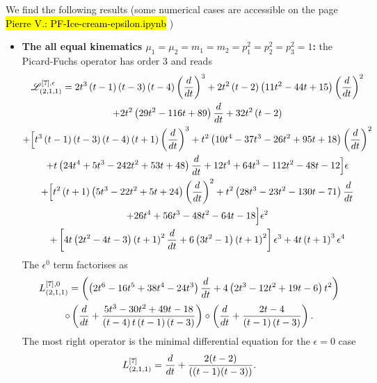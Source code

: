 \documentclass[a4paper,12pt]{article}
\numberwithin{equation}{section}
\numberwithin{figure}{subsection}
\theoremstyle{plain}
\theoremstyle{plain}
\theoremstyle{definition}
\theoremstyle{plain}
\theoremstyle{remark}
\theoremstyle{plain}
\newcommand{\pvnote}[1]{\sethlcolor{bubblegum} \protect\hl{Pierre V.: #1} \sethlcolor{yellow}}
\begin{document}
We find the following results (some numerical cases are accessible on
the page \pvnote{PF-Ice-cream-epsilon.ipynb})
\begin{itemize}
\item {\bf The all equal kinematics
  $\mu_1=\mu_2=m_1=m_2=p_1^2=p_2^2=p_3^2=1$:} the Picard-Fuchs operator
  has order 3 and
  reads
  \begin{multline}
\mathscr{L}_{(2,1,1)}^{[7],\epsilon}= 2 t^{3} \left(t -1\right)
\left(t -3\right) \left(t -4\right) \left(d\over dt\right)^{3}+2 t^{2} \left(t
  -2\right) \left(11 t^{2}-44 t +15\right) \left(d\over dt\right)^{2}\cr+2 t^{2}
\left(29 t^{2}-116 t +89\right) {d\over dt} +32 t^{2} \left(t
  -2\right)\cr
+\Big[t^{3} \left(t -1\right) \left(t -3\right) \left(t -4\right) \left(t +1\right) \left(d\over dt\right)^{3}+t^{2} \left(10 t^{4}-37 t^{3}-26 t^{2}+95 t +18\right) \left(d\over dt\right)^{2}\cr+t \left(24 t^{4}+5 t^{3}-242 t^{2}+53 t +48\right)  {d\over dt} +12 t^{4}+64 t^{3}-112 t^{2}-48 t -12
\Big]\epsilon\cr
+\Big[t^{2} \left(t +1\right) \left(5 t^{3}-22 t^{2}+5 t +24\right) \left(d\over dt\right)^{2}+t^{2} \left(28 t^{3}-23 t^{2}-130 t -71\right)  {d\over dt} \cr+26 t^{4}+56 t^{3}-48 t^{2}-64 t -18\Big]\epsilon^2\cr
+\left[4 t \left(2 t^{2}-4 t -3\right) \left(t +1\right)^{2}
  {d\over dt}+6 \left(3 t^{2}-1\right) \left(t +1\right)^{2}\right]
\epsilon^3+ 4 t \left(t +1\right)^{3}\epsilon^4
\end{multline}
The $\epsilon^0$ term factorises as
\begin{multline}
    L_{(2,1,1)}^{[7],0}=\left(
\left(2 t^{6}-16 t^{5}+38 t^{4}-24 t^{3}\right) {{d\over dt}} +4 \left(2 t^{3}-12 t^{2}+19 t -6\right) t^{2}\right)\cr\circ
\left(
{{d\over dt}} +\frac{5 t^{3}-30 t^{2}+49 t -18}{\left(t -4\right) t \left(t -1\right) \left(t -3\right)}
\right)\circ \left({{d\over dt}} +\frac{2 t -4}{\left(t -1\right) \left(t -3\right)}
\right).
\end{multline}
The most right operator is the minimal differential equation for the
$\epsilon=0$ case
\begin{equation}
  L_{(2,1,1)}^{[7]}= {d\over dt}+ {2(t - 2)\over ((t - 1)(t - 3))  }.
\end{equation}



\end{itemize}
\end{document}
